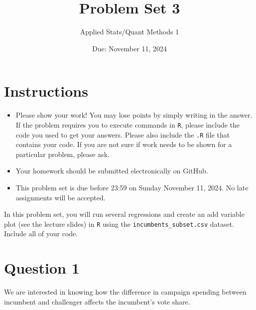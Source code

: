 \documentclass[12pt,letterpaper]{article}
\title{Problem Set 3}
\date{Due: November 11, 2024}
\author{Applied Stats/Quant Methods 1}
\begin{document}
	\maketitle
	\section*{Instructions}
	\begin{itemize}
		\item Please show your work! You may lose points by simply writing in the answer. If the problem requires you to execute commands in \texttt{R}, please include the code you used to get your answers. Please also include the \texttt{.R} file that contains your code. If you are not sure if work needs to be shown for a particular problem, please ask.
	\item Your homework should be submitted electronically on GitHub.
	\item This problem set is due before 23:59 on Sunday November 11, 2024. No late assignments will be accepted.

	\end{itemize}

		\vspace{.25cm}
	
\noindent In this problem set, you will run several regressions and create an add variable plot (see the lecture slides) in \texttt{R} using the \texttt{incumbents\_subset.csv} dataset. Include all of your code.

	\vspace{.5cm}
	\newpage
\section*{Question 1}
\vspace{.25cm}
\noindent We are interested in knowing how the difference in campaign spending between incumbent and challenger affects the incumbent's vote share. 
	
	
\end{document}
